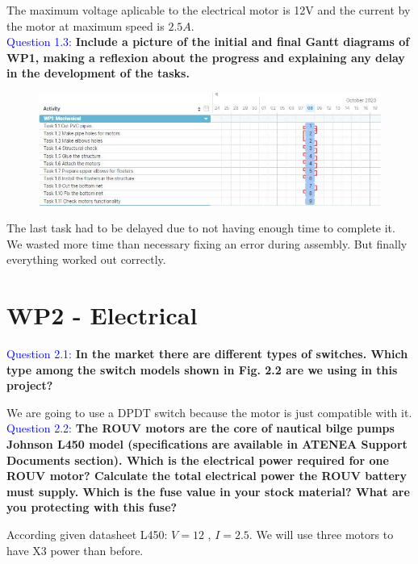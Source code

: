 \documentclass[12pt, a4papre]{article}
\begin{document}
	The maximum voltage aplicable to the electrical motor is 12V and the current by the motor at maximum speed is $2.5A$.\\
	\newpage
	\textcolor{blue}{Question 1.3:} \textbf{Include a picture of the initial and final Gantt diagrams of WP1, making a reflexion about the progress and explaining any delay in the development of the tasks.}
	
	\begin{figure}[H]
		\begin{center}
		\includegraphics[width=150mm]{WP1-1-10-2020.jpg}
		\end{center}
	\end{figure}
	
	The last task had to be delayed due to not having enough time to complete it. We wasted more time than necessary fixing an error during assembly. But finally everything worked out correctly.

	
	\newpage
	\section{WP2 - Electrical} 
	
	\textcolor{blue}{Question 2.1:} \textbf{In the market there are different types of switches. Which type among the switch models shown in Fig. 2.2 are we using in this project?}
	
	We are going to use a DPDT switch because the motor is just compatible with it.\\
	
	\textcolor{blue}{Question 2.2:} \textbf{The ROUV motors are the core of nautical bilge pumps Johnson L450 model (specifications are available in ATENEA Support Documents section). Which is the electrical power required for one ROUV motor? Calculate the total electrical power the ROUV battery must supply. Which is the fuse value in your stock material? What are you protecting with this fuse?}
	
	According given datasheet L450: $V=12$ , $I=2.5$. We will use three motors to have X3 power than before.
	
\end{document}

